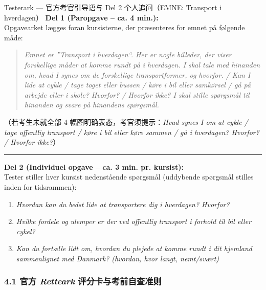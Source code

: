 \begin{emailbox}{Testerark --- 官方考官引导语与 Del 2 个人追问（EMNE: Transport i hverdagen）}
\textbf{\color{NCDRed}Del 1 (Paropgave -- ca. 4 min.):}\\
Opgavearket lægges foran kursisterne, der præsenteres for emnet på følgende måde:
\begin{quote}
\textit{Emnet er ”Transport i hverdagen“. Her er nogle billeder, der viser forskellige måder at komme rundt på i hverdagen. I skal tale med hinanden om, hvad I synes om de forskellige transportformer, og hvorfor. / Kan I lide at cykle / tage toget eller bussen / køre i bil eller samkørsel / gå på arbejde eller i skole? Hvorfor? / Hvorfor ikke? I skal stille spørgsmål til hinanden og svare på hinandens spørgsmål.}
\end{quote}
\small\textcolor{NCDGray}{（若考生未就全部 4 幅图明确表态，考官须提示：\textit{Hvad synes I om at cykle / tage offentlig transport / køre i bil eller køre sammen / gå i hverdagen? Hvorfor? / Hvorfor ikke?}）}

\vspace{0.35em}
\hrule
\vspace{0.35em}
\normalsize
\textbf{\color{NCDRed}Del 2 (Individuel opgave -- ca. 3 min. pr. kursist):}\\
Tester stiller hver kursist nedenstående spørgsmål (uddybende spørgsmål stilles inden for tidsrammen):
\begin{enumerate}
  \item \textit{Hvordan kan du bedst lide at transportere dig i hverdagen? Hvorfor?}
  \item \textit{Hvilke fordele og ulemper er der ved offentlig transport i forhold til bil eller cykel?}
  \item \textit{Kan du fortælle lidt om, hvordan du plejede at komme rundt i dit hjemland sammenlignet med Danmark? (hvordan, hvor langt, nemt/svært)}
\end{enumerate}
\end{emailbox}

\clearpage
{}

\subsubsection*{4.1 官方 \textit{Retteark} 评分卡与考前自查准则}

